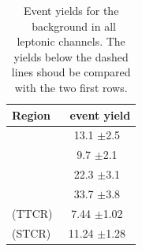 	
	\begin{table}[htbp]
		\begin{center}
			\begin{tabular} {l c}
				\toprule
				Region & \ttbar\ event yield  \\ 
				\midrule 
				\STSR & 13.1 $\pm $2.5 \\
				\TTSR & 9.7 $\pm $2.1 \\
				\TTCR & 22.3 $\pm $3.1 \\
				\STCR & 33.7 $\pm $3.8 \\
				\hdashline
				\TTSR(TTCR) & 7.44 $\pm $1.02 \\
				\STSR(STCR)& 11.24 $\pm $1.28 \\  				 
				\bottomrule
			\end{tabular}
			\caption{Event yields for the \ttbar\ background in all leptonic channels. The yields below the dashed lines shoud be compared with the two first rows. }
		\end{center}
	\end{table}
